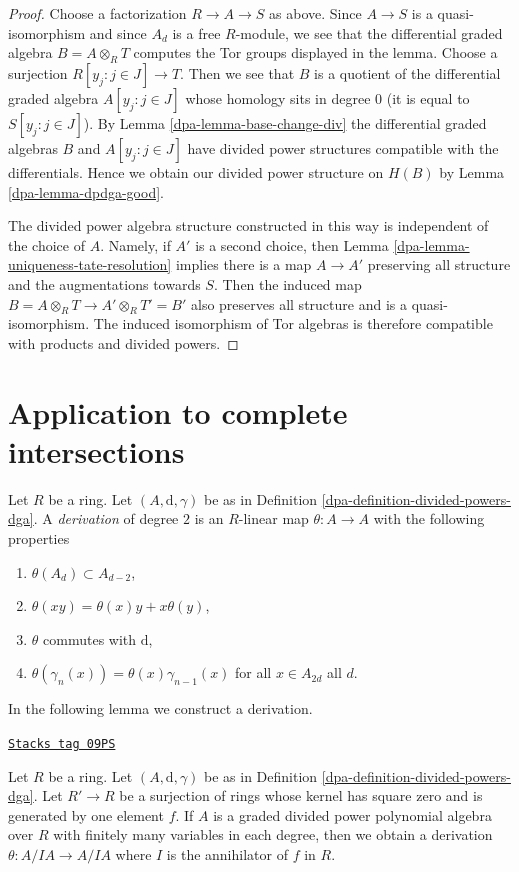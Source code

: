 \begin{proof}

Choose a factorization $R \to A \to S$ as above. Since $A \to S$
is a quasi-isomorphism and since $A_d$ is a free $R$-module,
we see that the differential graded algebra $B = A \otimes_R T$ computes
the Tor groups displayed in the lemma. Choose a surjection
$R[y_j:j\in J] \to T$. Then we see that
$B$ is a quotient of the differential graded algebra
$A[y_j:j\in J]$ whose homology sits in degree $0$ (it is equal
to $S[y_j:j\in J]$).
By Lemma \ref{dpa-lemma-base-change-div} the differential graded algebras $B$ and
$A[y_j:j\in J]$ have divided power structures compatible
with the differentials. Hence we obtain our divided
power structure on $H(B)$ by Lemma \ref{dpa-lemma-dpdga-good}.

\medskip\noindent
The divided power algebra structure constructed in this way is independent
of the choice of $A$. Namely, if $A'$ is a second choice, then
Lemma \ref{dpa-lemma-uniqueness-tate-resolution}
implies there is a map $A \to A'$ preserving all structure and the
augmentations towards $S$. Then the induced map
$B = A \otimes_R T \to A' \otimes_R T' = B'$ also preserves
all structure
and is a quasi-isomorphism. The induced isomorphism of
Tor algebras is therefore compatible with products
and divided powers.
\end{proof}

\section{Application to complete intersections}
\label{dpa-section-application-ci}
Let $R$ be a ring. Let $(A, \text{d}, \gamma)$ be as in
Definition \ref{dpa-definition-divided-powers-dga}.
A {\it derivation} of degree $2$ is an $R$-linear
map $\theta : A \to A$ with the following
properties
\begin{enumerate}
\item $\theta(A_d) \subset A_{d - 2}$,
\item $\theta(xy) = \theta(x)y + x\theta(y)$,
\item $\theta$ commutes with $\text{d}$,
\item $\theta(\gamma_n(x)) = \theta(x) \gamma_{n - 1}(x)$
for all $x \in A_{2d}$ all $d$.
\end{enumerate}
In the following lemma we construct a derivation.

\begin{lemma}
\label{dpa-lemma-get-derivation}
\href{https://stacks.math.columbia.edu/tag/09PS}{\texttt{Stacks tag 09PS}}

Let $R$ be a ring. Let $(A, \text{d}, \gamma)$ be as in
Definition \ref{dpa-definition-divided-powers-dga}.
Let $R' \to R$ be a surjection of rings whose kernel
has square zero and is generated by one element $f$.
If $A$ is a graded divided power polynomial algebra over $R$
with finitely many variables in each degree,
then we obtain a derivation
$\theta : A/IA \to A/IA$ where $I$ is the annihilator
of $f$ in $R$.
\end{lemma}

